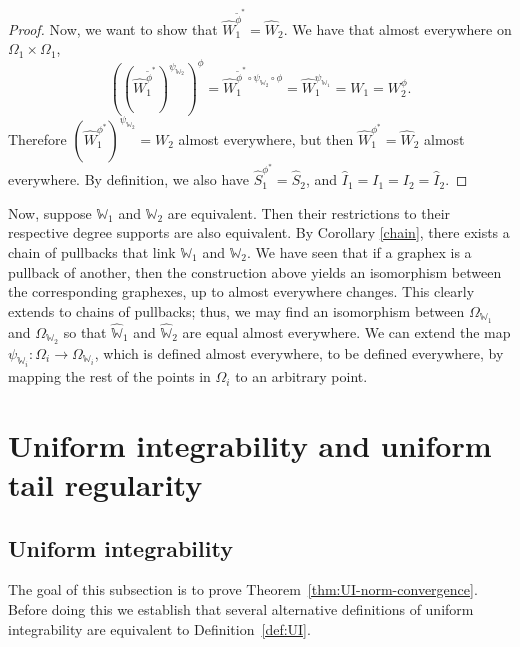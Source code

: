 \documentclass{amsart}
\numberwithin{equation}{section}
\numberwithin{figure}{section}
\theoremstyle{definition}
\theoremstyle{remark}
\newcommand{\cW}{\mathbb{W}}
\begin{document}
\begin{proof}
Now, we want to show that $\widehat{W}_1^{\widetilde{\phi}^*}=\widehat{W}_2$.
We have that almost everywhere on $\Omega_1 \times \Omega_1$,
\[
((\widehat{W}_1^{\widetilde\phi^*})^{\psi_{\cW_2}})^{\phi}=\widehat{W}_1^{\widetilde\phi^* \circ \psi_{\cW_2} \circ \phi}=\widehat{W}_1^{\psi_{\cW_1}}=W_1=W_2^\phi.
\]
Therefore $(\widehat{W}_1^{\phi^*})^{\psi_{\cW_2}}=W_2$ almost everywhere,
but then $\widehat{W}_1^{\phi^*}=\widehat{W}_2$ almost everywhere. By
definition, we also have $\widehat{S}_1^{\phi^*}=\widehat{S}_2$, and
$\widehat{I}_1=I_1=I_2=\widehat{I}_2$.
\end{proof}

Now, suppose $\cW_1$ and $\cW_2$ are equivalent. Then their restrictions to
their respective degree supports are also equivalent. By Corollary
\ref{chain}, there exists a chain of pullbacks that link $\cW_1$ and $\cW_2$.
We have seen that if a graphex is a pullback of another, then the
construction above yields an isomorphism between the corresponding graphexes,
up to almost everywhere changes. This clearly extends to chains of pullbacks;
thus, we may find an isomorphism between $\Omega_{\cW_1}$ and
$\Omega_{\cW_2}$ so that $\widehat{\cW}_1$ and $\widehat{\cW}_2$ are equal
almost everywhere. We can extend the map $\psi_{\cW_i}\colon \Omega_i
\rightarrow \Omega_{\cW_i}$, which is defined almost everywhere, to be
defined everywhere, by mapping the rest of the points in $\Omega_i$ to an
arbitrary point.


\section{Uniform integrability and uniform tail regularity}
\label{sec:UIandUTR}

\subsection{Uniform integrability}

The goal of this subsection is to prove
Theorem~\ref{thm:UI-norm-convergence}. Before doing this we establish that
several alternative definitions of uniform integrability are equivalent to
Definition~\ref{def:UI}.
\end{document}
